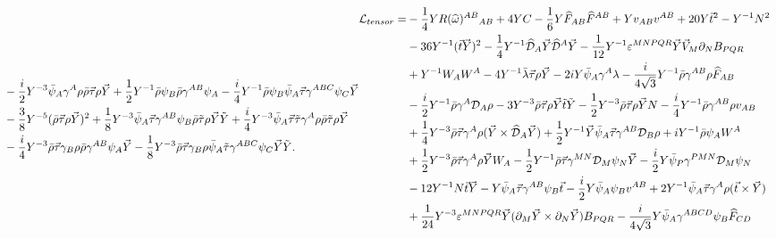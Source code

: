 \documentclass[a4paper,12pt, twoside]{article}
\numberwithin{equation}{section}
\begin{document}
\begin{equation}
{\begin{split}
& 
-\frac{i}{2}Y^{-3}\bar{\psi}_A\gamma^A\rho\bar{\rho}\vec{\tau}\rho\vec{Y}+\frac{1}{2}Y^{-1}\bar{\rho}\psi_B\bar{\rho}\gamma^{AB}\psi_A-\frac{i}{4}Y^{-1}\bar{\rho}\psi_B\bar{\psi}_A\vec{\tau}\gamma^{ABC}\psi_C\vec{Y}\\
& -\frac{3}{8}Y^{-5}(\bar{\rho}\vec{\tau}\rho\vec{Y})^2 + 
\frac{1}{8}Y^{-3}\bar{\psi}_A\vec{\tau}\gamma^{AB}\psi_B\bar{\rho}\tilde{\tau}\rho\vec{Y}\tilde{Y} 
+ 
\frac{i}{4}Y^{-3}\bar{\psi}_A\vec{\tau}\tilde{\tau}\gamma^A\rho\bar{\rho}\tilde{\tau}\rho\vec{Y}\\
&  
-\frac{i}{4}Y^{-3}\bar{\rho}\vec{\tau}\gamma_B\rho\bar{\rho}\gamma^{AB}\psi_A\vec{Y} - 
\frac{1}{8}Y^{-3}\bar{\rho}\vec{\tau}\gamma_B\rho\bar{\psi}_A\tilde{\tau}\gamma^{ABC}\psi_C\vec{Y}\tilde{Y}.\label{tensact}
\end{split}
}{
\begin{split}
{\cal L}_{tensor} = & 
-\frac{1}{4}YR(\widehat{\omega})^{AB}{}_{AB}+4YC-\frac{1}{6}Y\widehat{F}_{AB}\widehat{F}^{AB}+Yv_{AB}v^{AB}+20 
Y\vec{t}^2  -  Y^{-1}N^2\\
&  - 36Y^{-1}(\vec{t}\vec{Y})^2 -\frac{1}{4}Y^{-1}\widehat{\cal 
D}_A\vec{Y}\widehat{\cal D}^A\vec{Y}- 
\frac{1}{12}Y^{-1}\varepsilon^{MNPQR}\vec{Y}\vec{V}_M\partial_N B_{PQR}\\ 
& + Y^{-1}W_A W^A- 4Y^{-1}\bar{\lambda}\vec{\tau}\rho\vec{Y} 
-  
2iY\bar{\psi}_A\gamma^A\lambda-\frac{i}{4\sqrt{3}}Y^{-1}\bar{\rho}\gamma^{AB}\rho\widehat{F}_{AB}\\
& - \frac{i}{2}Y^{-1}\bar{\rho}\gamma^A {\cal 
D}_A\rho-3Y^{-3}\bar{\rho}\vec{\tau}\rho\vec{Y}\tilde{t}\tilde{Y} - 
\frac{1}{2}Y^{-3}\bar{\rho}\vec{\tau}\rho\vec{Y}N-\frac{i}{4}Y^{-1}\bar{\rho}\gamma^{AB}\rho 
v_{AB}\\
& +\frac{1}{4}Y^{-3}\bar{\rho}\vec{\tau}\gamma^A\rho(\vec{Y}\times 
\widehat{\cal D}_A\vec{Y}) 
+\frac{1}{2}Y^{-1}\vec{Y}\bar{\psi}_A\vec{\tau}\gamma^{AB}{\cal D}_B\rho+ iY^{-1}\bar{\rho}\psi_A W^A\\
&  + \frac{1}{2}Y^{-3}\bar{\rho}\vec{\tau}\gamma^A\rho \vec{Y}W_A - 
\frac{1}{2}Y^{-1}\bar{\rho}\vec{\tau}\gamma^{MN}{\cal D}_M\psi_N 
\vec{Y}-\frac{i}{2}Y\bar{\psi}_P\gamma^{PMN}{\cal D}_M\psi_N\\ 
& -12 Y^{-1}N\vec{t}\vec{Y}-Y\bar{\psi}_A\vec{\tau}\gamma^{AB}\psi_B 
\vec{t}-\frac{i}{2}Y\bar{\psi}_A\psi_B 
v^{AB}+2Y^{-1}\bar{\psi}_A\vec{\tau}\gamma^A\rho(\vec{t}\times\vec{Y})\\
& + 
\frac{1}{24}Y^{-3}\varepsilon^{MNPQR}\vec{Y}(\partial_M\vec{Y}\times\partial_N\vec{Y})B_{PQR}
-  
\frac{i}{4\sqrt{3}}Y\bar{\psi}_A\gamma^{ABCD}\psi_B\widehat{F}_{CD}\\

\end{split}}
\end{equation}
\end{document}
